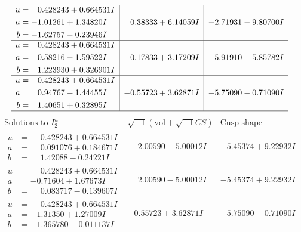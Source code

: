 \documentclass[1p]{elsarticle_modified}
\theoremstyle{definition}
\newcommand{\I}{\sqrt{-1}}
\begin{document}
$$\begin{array}{c|c|c}
\begin{aligned}
u &= \phantom{-}0.428243 + 0.664531 I \\
a &= -1.01261 + 1.34820 I \\
b &= -1.62757 - 0.23946 I\end{aligned}
 & \phantom{-}0.38333 + 6.14059 I & -2.71931 - 9.80700 I \\ \hline\begin{aligned}
u &= \phantom{-}0.428243 + 0.664531 I \\
a &= \phantom{-}0.58216 - 1.59522 I \\
b &= \phantom{-}1.223930 + 0.326901 I\end{aligned}
 & -0.17833 + 3.17209 I & -5.91910 - 5.85782 I \\ \hline\begin{aligned}
u &= \phantom{-}0.428243 + 0.664531 I \\
a &= \phantom{-}0.94767 - 1.44455 I \\
b &= \phantom{-}1.40651 + 0.32895 I\end{aligned}
 & -0.55723 + 3.62871 I & -5.75090 - 0.71090 I\\
 \hline 
 \end{array}$$\newpage$$\begin{array}{c|c|c}  
\text{Solutions to }I^u_{2}& \I (\text{vol} + \sqrt{-1}CS) & \text{Cusp shape}\\
 \hline 
\begin{aligned}
u &= \phantom{-}0.428243 + 0.664531 I \\
a &= \phantom{-}0.091076 + 0.184671 I \\
b &= \phantom{-}1.42088 - 0.24221 I\end{aligned}
 & \phantom{-}2.00590 - 5.00012 I & -5.45374 + 9.22932 I \\ \hline\begin{aligned}
u &= \phantom{-}0.428243 + 0.664531 I \\
a &= -0.71604 + 1.67673 I \\
b &= \phantom{-}0.083717 - 0.139607 I\end{aligned}
 & \phantom{-}2.00590 - 5.00012 I & -5.45374 + 9.22932 I \\ \hline\begin{aligned}
u &= \phantom{-}0.428243 + 0.664531 I \\
a &= -1.31350 + 1.27009 I \\
b &= -1.365780 - 0.011137 I\end{aligned}
 & -0.55723 + 3.62871 I & -5.75090 - 0.71090 I \\ \hline\begin{aligned}

\end{aligned}
\end{array}$$
\end{document}
